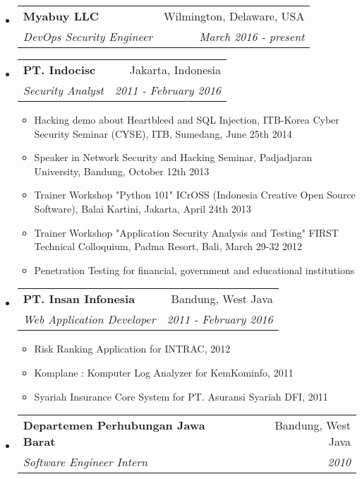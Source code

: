 \documentclass[letterpaper,11pt]{article}
\makeatletter
\newcommand{\resitem}[1]{\item #1 \vspace{-2pt}}
\newcommand{\ressubheading}[4]{

\begin{tabular*}{6.5in}{l@{\cftdotfill{\cftsecdotsep}\extracolsep{\fill}}r}

		\textbf{#1} & #2 \\

		\textit{#3} & \textit{#4} \\

\end{tabular*}\vspace{-6pt}}
\makeatother
\begin{document}
\begin{itemize}

\item

    \ressubheading{Myabuy LLC}{Wilmington, Delaware, USA}{DevOps Security Engineer}{March 2016 - present}

\item

	\ressubheading{PT. Indocisc}{Jakarta, Indonesia}{Security Analyst}{2011 - February 2016}

	\begin{itemize}

    \resitem{Hacking demo about Heartbleed and SQL Injection, ITB-Korea Cyber Security Seminar (CYSE), ITB, Sumedang, June 25th 2014}

		\resitem{Speaker in Network Security and Hacking Seminar, Padjadjaran University, Bandung, October 12th 2013}

		\resitem{Trainer Workshop "Python 101" ICrOSS (Indonesia Creative Open Source Software), Balai Kartini, Jakarta, April 24th 2013}

		\resitem{Trainer Workshop "Application Security Analysis and Testing" FIRST Technical Colloquium, Padma Resort, Bali, March 29-32 2012}

		\resitem{Penetration Testing for financial, government and educational institutions}

	\end{itemize}

\item

	\ressubheading{PT. Insan Infonesia}{Bandung, West Java}{Web Application Developer}{2011 - February 2016}

	\begin{itemize}

    \resitem{Risk Ranking Application for INTRAC, 2012}

    \resitem{Komplane : Komputer Log Analyzer for KemKominfo, 2011}

		\resitem{Syariah Insurance Core System for PT. Asuransi Syariah DFI, 2011}

	\end{itemize}

\item

	\ressubheading{Departemen Perhubungan Jawa Barat}{Bandung, West Java}{Software Engineer Intern}{2010}

	\begin{itemize}


\end{itemize}
\end{itemize}
\end{document}
